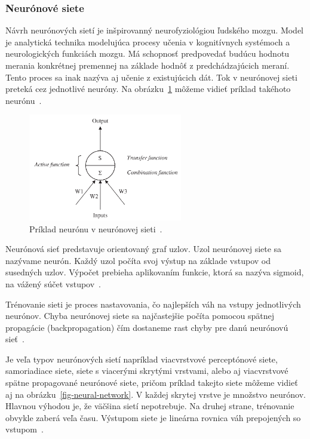 \documentclass[a4paper,slovak,12pt,appendix]{article}
\begin{document}
\subsubsection{Neurónové siete}
Návrh neurónových sietí je inšpirovanný neurofyziológiou ľudského mozgu. Model
je analytická technika modelujúca procesy učenia v kognitívnych systémoch
a neurologických funkciách mozgu. Má schopnosť predpovedať budúcu hodnotu
merania konkrétnej premennej na základe hodnôť z predchádzajúcich meraní. Tento
proces sa inak nazýva aj učenie z existujúcich dát. Tok v neurónovej sieti
preteká cez jednotlivé neuróny. Na obrázku~\ref{fig-neuron} môžeme vidieť
príklad takéhoto neurónu~\cite{Tso2007}.

\begin{figure}[!ht]
  \centering
  \includegraphics[width=0.6\textwidth]{neuron.png}
  \caption{Príklad neurónu v neurónovej sieti~\cite{Tso2007}.}
  \label{fig-neuron}
\end{figure}

Neurónová sieť predstavuje orientovaný graf uzlov. Uzol neurónovej
siete sa nazývame neurón. Každý uzol počíta svoj výstup na základe vstupov od
susedných uzlov. Výpočet prebieha aplikovaním funkcie, ktorá sa nazýva sigmoid,
na vážený súčet vstupov~\cite{Gruau1994}.

Trénovanie sieti je proces nastavovania, čo najlepších váh na vstupy
jednotlivých neurónov. Chyba neurónovej siete sa najčastejšie počíta pomocou
spätnej propagácie (backpropagation) čím dostaneme rast chyby pre danú
neurónovú sieť~\cite{Tso2007}.

Je veľa typov neurónových sietí napríklad viacvrstvové perceptónové siete,
samoriadiace siete, siete s viacerými skrytými vrstvami, alebo aj viacvrstvové
spätne propagované neurónové siete, pričom príklad takejto siete môžeme vidieť
aj na obrázku~\ref{fig-neural-network}. V každej skrytej vrstve je množstvo
neurónov. Hlavnou výhodou je, že väčšina sietí nepotrebuje. Na druhej strane,
trénovanie obvykle zaberá veľa času. Výstupom siete je lineárna rovnica váh
prepojených so vstupom~\cite{KumarSingh2013}.
\end{document}
